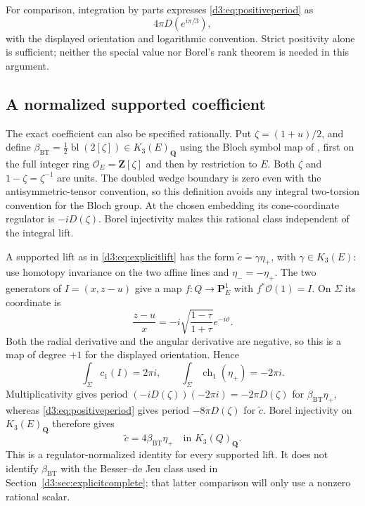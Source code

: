 \documentclass[11pt,a4paper]{amsart}
\numberwithin{equation}{section}
\theoremstyle{definition}
\theoremstyle{remark}
\newcommand{\Q}{\mathbf Q}
\newcommand{\Z}{\mathbf Z}
\newcommand{\OO}{\mathcal O}
\begin{document}
For comparison, integration by parts expresses \eqref{d3:eq:positiveperiod} as
\[
4\pi D(e^{i\pi/3}),
\]
with the displayed orientation and logarithmic convention. Strict positivity alone is sufficient; neither the special value nor Borel's rank theorem is needed in this argument.

\subsection{A normalized supported coefficient}\label{d3:sec:exactcoefficient}
The exact coefficient can also be specified rationally. Put $\zeta=(1+u)/2$, and define $\beta_{\mathrm{BT}}=\tfrac12\operatorname{bl}(2[\zeta])\in K_3(E)_{\Q}$ using the Bloch symbol map of \cite[Theorem~4.9 and (4.8)]{BunkeTamme}, first on the full integer ring $\OO_E=\Z[\zeta]$ and then by restriction to $E$. Both $\zeta$ and $1-\zeta=\zeta^{-1}$ are units. The doubled wedge boundary is zero even with the antisymmetric-tensor convention, so this definition avoids any integral two-torsion convention for the Bloch group. At the chosen embedding its cone-coordinate regulator is $-iD(\zeta)$. Borel injectivity \cite[Section~6]{BunkeTamme} makes this rational class independent of the integral lift.

A supported lift as in \eqref{d3:eq:explicitlift} has the form $\widetilde c=\gamma\eta_+$, with $\gamma\in K_3(E)$: use homotopy invariance on the two affine lines and $\eta_-=-\eta_+$. The two generators of $I=(x,z-u)$ give a map $f:Q\to\mathbf P^1_E$ with $f^*\OO(1)=I$. On $\Sigma$ its coordinate is
\[
\frac{z-u}{x}=-i\sqrt{\frac{1-\tau}{1+\tau}}e^{-i\vartheta}.
\]
Both the radial derivative and the angular derivative are negative, so this is a map of degree $+1$ for the displayed orientation. Hence
\[
\int_\Sigma c_1(I)=2\pi i,\qquad
\int_\Sigma\operatorname{ch}_1(\eta_+)=-2\pi i.
\]
Multiplicativity gives period $(-iD(\zeta))(-2\pi i)=-2\pi D(\zeta)$ for $\beta_{\mathrm{BT}}\eta_+$, whereas \eqref{d3:eq:positiveperiod} gives period $-8\pi D(\zeta)$ for $\widetilde c$. Borel injectivity on $K_3(E)_{\Q}$ therefore gives
\begin{equation}\label{d3:eq:exactcoefficient}
\widetilde c=4\beta_{\mathrm{BT}}\eta_+
\quad\text{in }K_3(Q)_{\Q}.
\end{equation}
This is a regulator-normalized identity for every supported lift. It does not identify $\beta_{\mathrm{BT}}$ with the Besser--de Jeu class used in Section~\ref{d3:sec:explicitcomplete}; that latter comparison will only use a nonzero rational scalar.
\end{document}
